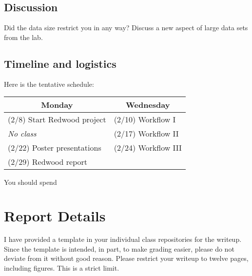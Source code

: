 \documentclass[11pt, oneside]{article}   	%
\begin{document}
\subsection*{Discussion}

Did the data size restrict you in any way? Discuss a new aspect of large data
sets from the lab.

\subsection*{Timeline and logistics}

Here is the tentative schedule:

\begin{table}[h]
\centering
\begin{tabular}{@{}l|l@{}}
\toprule
\multicolumn{1}{c|}{Monday} & \multicolumn{1}{c}{Wednesday} \\
\hline
(2/8) Start Redwood project   & (2/10) Workflow I \\
\emph{\hspace{12mm} No class} & (2/17) Workflow II \\
(2/22) Poster presentations   & (2/24) Workflow III \\
(2/29) Redwood report         & \\
\bottomrule
\end{tabular}
\end{table}

You should spend

\section{Report Details}

I have provided a template in your individual class repositories for the
writeup. Since the template is intended, in part, to make grading easier,
please do not deviate from it without good reason.  Please restrict your
writeup to twelve pages, including figures. This is a strict limit.



\end{document}
